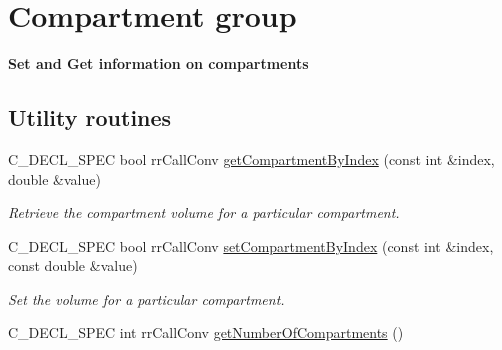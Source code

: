 \hypertarget{group__compartment}{
\section{\-Compartment group}
\label{group__compartment}
}


{\bfseries  \-Set and \-Get information on compartments } 


\subsection*{\-Utility routines}
\begin{DoxyCompactItemize}
\item 
\-C\-\_\-\-D\-E\-C\-L\-\_\-\-S\-P\-E\-C bool rr\-Call\-Conv \hyperlink{group__utility_ga5241b915cff8bcabba3024c33fb4e336}{get\-Compartment\-By\-Index} (const int \&index, double \&value)
\begin{DoxyCompactList}\small\item\em \-Retrieve the compartment volume for a particular compartment. \end{DoxyCompactList}\item 
\-C\-\_\-\-D\-E\-C\-L\-\_\-\-S\-P\-E\-C bool rr\-Call\-Conv \hyperlink{group__utility_gadb238a943d93bc9548bf5c3cd452e9bb}{set\-Compartment\-By\-Index} (const int \&index, const double \&value)
\begin{DoxyCompactList}\small\item\em \-Set the volume for a particular compartment. \end{DoxyCompactList}\item 
\hypertarget{group__utility_ga5ea2479b882549edd4fb75397ca38f52}{
\-C\-\_\-\-D\-E\-C\-L\-\_\-\-S\-P\-E\-C int rr\-Call\-Conv \hyperlink{group__utility_ga5ea2479b882549edd4fb75397ca38f52}{get\-Number\-Of\-Compartments} ()}
\label{group__utility_ga5ea2479b882549edd4fb75397ca38f52}


\end{DoxyCompactItemize}
